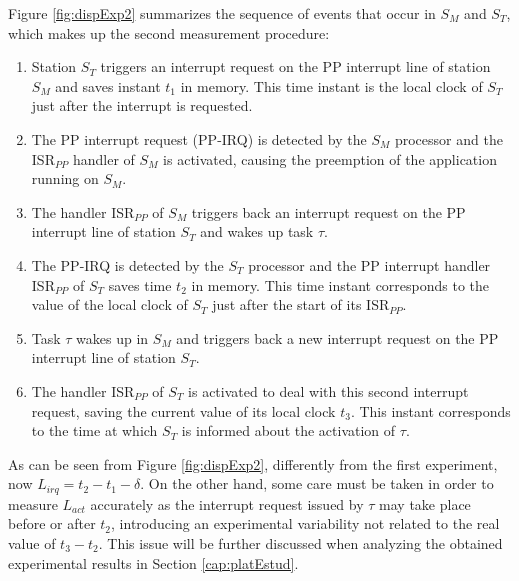 \documentclass{acm_proc_article-sp}
\begin{document}

Figure \ref{fig:dispExp2} summarizes the sequence of events that occur in $S_M$ and
$S_T$, which makes up the second measurement procedure:

\begin{enumerate}
\item Station $S_T$ triggers an interrupt request on the PP interrupt line of
  station $S_M$ and saves instant $t_1$ in memory. This time instant is the local
  clock of $S_T$ just after the interrupt is requested.
 
\item The PP interrupt request (PP-IRQ) is detected by the $S_M$ processor and
    the ISR$_{PP}$ handler of $S_M$ is activated, causing the preemption of the
    application running on $S_M$.

\item The handler ISR$_{PP}$ of $S_M$ triggers back an interrupt request on
  the PP interrupt line of station $S_T$ and wakes up task $\tau$.
  
\item The PP-IRQ is detected by the $S_T$ processor and the PP interrupt handler
    ISR$_{PP}$ of $S_T$ saves time $t_2$ in memory.  This time instant corresponds
    to the value of the local clock of $S_T$ just after the start of its ISR$_{PP}$.
  
\item Task $\tau$ wakes up in $S_M$ and triggers back a new interrupt request on the
  PP interrupt line of station $S_T$.
  
\item The handler ISR$_{PP}$ of $S_T$ is activated to deal with this second interrupt
  request, saving the current value of its local clock $t_3$. This instant
  corresponds to the time at which $S_T$ is informed about the activation of $\tau$.
\end{enumerate}

As can be seen from Figure \ref{fig:dispExp2}, differently from the first
experiment, now $L_{irq} = t_2 - t_1 - \delta$.  On the other hand, some care must
be taken in order to measure $L_{act}$ accurately as the interrupt request issued by
$\tau$ may take place before or after $t_2$, introducing an experimental variability
not related to the real value of $t_3 - t_2$. This issue will be further discussed
when analyzing the obtained experimental results in Section \ref{cap:platEstud}.
\end{document}
